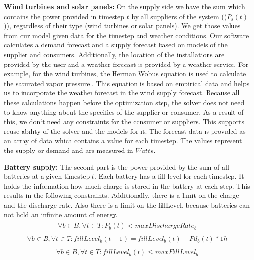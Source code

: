 \textbf{Wind turbines and solar panels:} On the supply side we have the sum which contains the power provided in timestep $t$ by all suppliers of the system (($P_{s}(t)$)), regardless of their type (wind turbines or solar panels).
We get those values from our model given data for the timestep and weather conditions. 
Our software calculates a demand forecast and a supply forecast based on models of the supplier and consumers. 
Additionally, the location of the installations are provided by the user and a weather forecast is provided by a weather service. 
For example, for the wind turbines, the Herman Wobus equation is used to calculate the saturated vapor pressure \cite{NOAA}. 
This equation is based on empirical data and helps us to incorporate the weather forecast in the wind supply forecast. 
Because all these calculations happen before the optimization step, the solver does not need to know anything about the specifics of the supplier or consumer. As a result of this, we don`t need any constraints for the consumer or suppliers. 
This supports reuse-ability of the solver and the models for it. 
The forecast data is provided as an array of data which contains a value for each timestep. 
The values represent the supply or demand and are measured in $Watts$.  %

\textbf{Battery supply:} The second part is the power provided by the sum of all batteries at a given timestep $t$.  Each battery has a fill level for each timestep. It holds the information how much charge is stored in the battery at each step. This results in the following constraints. Additionally, there is a limit on the charge and the discharge rate. Also there is a limit on the fillLevel, because batteries can not hold an infinite amount of energy.
\begin{align} \label{eq:limitDischarge}
\begin{split}
\forall b \in B, \forall t \in T: P_{b}(t) < maxDischargeRate_{b}
\end{split}
\end{align}
\begin{align} \label{eq:discharge100}
\begin{split}
\forall b \in B, \forall t \in T: fillLevel_{b}(t+1) = fillLevel_{b}(t) - Pd_{b}(t) * 1h
\end{split}
\end{align}
\begin{align} \label{eq:maxlimit}
\begin{split}
\forall b \in B, \forall t \in T: fillLevel_{b}(t) \le maxFillLevel_{b}
\end{split}
\end{align}

